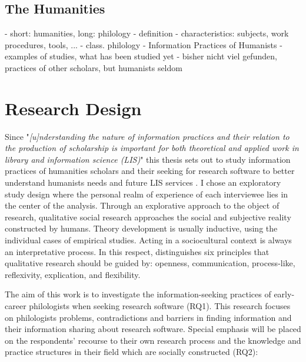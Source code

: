 \documentclass[12pt, a4paper, titlepage, oneside, abstract=true, toc=listof, toc=bibliography]{scrreprt}
\begin{document}
\section{The Humanities}
\label{sec:Humanities}
- short: humanities, long: philology
- definition
- characteristics: subjects, work procedures, tools, ...
- class. philology
- Information Practices of Humanists
	- examples of studies, what has been studied yet
	- bisher nicht viel gefunden, practices of other scholars, but humanists seldom
	
\chapter{Research Design}
\label{sec:RD}
Since "\textit{[u]nderstanding the nature of information practices and their relation to the production of scholarship is important for both theoretical and applied work in library and information science (LIS)}" \citep[p. 165]{Palmer2009} this thesis sets out to study information practices of humanities scholars and their seeking for research software to better understand humanists needs and future LIS services \citep{Case2008, Cunningham2010}. I chose an exploratory study design \citep{Rinsdorf2013} where the personal realm of experience of each interviewee lies in the center of the analysis. Through an explorative approach to the object of research, qualitative social research approaches the social and subjective reality constructed by humans. Theory development is usually inductive, using the individual cases of empirical studies. Acting in a sociocultural context is always an interpretative process. In this respect, \citet[p. 20ff]{Lamnek2005} distinguishes six principles that qualitative research should be guided by: openness, communication, process-like, reflexivity, explication, and flexibility.

The aim of this work is to investigate the information-seeking practices of early-career philologists when seeking research software (RQ1). This research focuses on philologists problems, contradictions and barriers in finding information and their information sharing about research software. Special emphasis will be placed on the respondents' recourse to their own research process and the knowledge and practice structures in their field \citep{Hjorland1995} which are socially constructed (RQ2):
\end{document}

